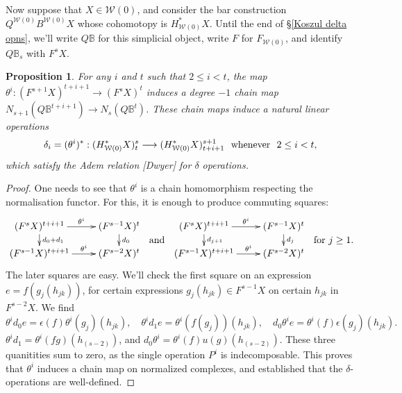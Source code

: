 \documentclass[11pt]{amsart}
\theoremstyle{plain}
\newtheorem{prop}[thm]{Proposition}
\theoremstyle{definition}
\renewcommand{\to}{\longrightarrow}
\newcommand{\calW}{\mathcal{W}}
\theoremstyle{plain}
\begin{document}
\begin{Cohomology operations for unstable Lie algebras over P}
Now suppose that $X\in\calW(0)$, and consider the bar construction $Q^{\calW(0)}B^{\calW(0)}X$ whose cohomotopy is $H^*_{\calW(0)}X$. Until the end of \S\ref{Koszul delta opns}, we'll write $Q\mathbb{B}$ for this simplicial object, write $F$ for $F_{\calW(0)}$, and identify $Q\mathbb{B}_s$ with $F^sX$.
\begin{prop}
For any $i$ and $t$ such that $2\leq i <t$, the map $\theta^i:(F^{s+1}X)^{t+i+1}\to (F^sX)^{t}$ induces a degree $-1$ chain map $N_{s+1}(Q\mathbb{B}^{t+i+1})\to N_{s}(Q\mathbb{B}^{t})$. These chain maps induce a natural linear operations
\[\delta_i=(\theta^i)^*:(H^*_{\calW(0)}X)^{s}_t\to (H^*_{\calW(0)}X)^{s+1}_{t+i+1}\textup{\ \ whenever\ \ }2\leq i <t,\] 
which satisfy the Adem relation [Dwyer] for $\delta$ operations.
\end{prop}
\begin{proof}
One needs to see that $\theta^i$ is a chain homomorphism respecting the normalisation functor.
For this, it is enough to produce commuting squares:
\[\xymatrix@R=4mm{
(F^sX)^{t+i+1}\ar[r]^-{\theta^i}
\ar[d]^-{d_0+d_1}&%
(F^{s-1}X)^{t}
\ar[d]^-{d_0}
\\%
(F^{s-1}X)^{t+i+1}\ar[r]^-{\theta^i}&%
(F^{s-2}X)^{t}%
}
\raisebox{-5mm}{\ \ and\ \ }
\xymatrix@R=4mm{
(F^sX)^{t+i+1}\ar[r]^-{\theta^i}
\ar[d]^-{d_{j+1}}&%
(F^{s-1}X)^{t}
\ar[d]^-{d_j}
\\%
(F^{s-1}X)^{t+i+1}\ar[r]^-{\theta^i}&%
(F^{s-2}X)^{t}%
}\raisebox{-5mm}{\ \ for $j\geq 1$.}\]
The later squares are easy. We'll check the first square on an expression $e=f(g_j(h_{jk}))$, for certain expressions $g_j(h_{jk})\in F^{s-1}X$ on certain $h_{jk}$ in $F^{s-2}X$. We find
\[\theta^i d_0e=\epsilon(f)\theta^i (g_j)(h_{jk}),\quad \theta^i d_1e=\theta^i (f(g_j))(h_{jk}),\quad d_0\theta^i e=\theta^i (f)\epsilon(g_j)(h_{jk}).\]
$\theta^i d_1=\theta^i (fg)(h_{(s-2)})$, and
$d_0\theta^i =\theta^i (f)u(g)(h_{(s-2)})$. 
These three quanitities sum to zero, as the single operation $P^i$ is indecomposable. This proves that $\theta^i$ induces a chain map on normalized complexes, and established that the $\delta$-operations are well-defined.


\end{proof}
\end{Cohomology operations for unstable Lie algebras over P}
\end{document}
